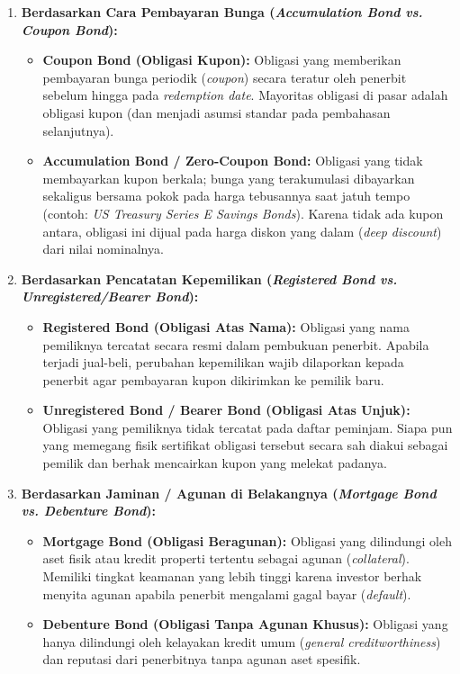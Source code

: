 \documentclass[11pt,a4paper]{article}
\begin{document}
\begin{enumerate}[label=\textbf{\arabic*.}]
    \item \textbf{Berdasarkan Cara Pembayaran Bunga (\textit{Accumulation Bond vs. Coupon Bond}):}
    \begin{itemize}
        \item \textbf{Coupon Bond (Obligasi Kupon):} Obligasi yang memberikan pembayaran bunga periodik (\textit{coupon}) secara teratur oleh penerbit sebelum hingga pada \textit{redemption date}. Mayoritas obligasi di pasar adalah obligasi kupon (dan menjadi asumsi standar pada pembahasan selanjutnya).
        \item \textbf{Accumulation Bond / Zero-Coupon Bond:} Obligasi yang tidak membayarkan kupon berkala; bunga yang terakumulasi dibayarkan sekaligus bersama pokok pada harga tebusannya saat jatuh tempo (contoh: \textit{US Treasury Series E Savings Bonds}). Karena tidak ada kupon antara, obligasi ini dijual pada harga diskon yang dalam (\textit{deep discount}) dari nilai nominalnya.
    \end{itemize}

    \item \textbf{Berdasarkan Pencatatan Kepemilikan (\textit{Registered Bond vs. Unregistered/Bearer Bond}):}
    \begin{itemize}
        \item \textbf{Registered Bond (Obligasi Atas Nama):} Obligasi yang nama pemiliknya tercatat secara resmi dalam pembukuan penerbit. Apabila terjadi jual-beli, perubahan kepemilikan wajib dilaporkan kepada penerbit agar pembayaran kupon dikirimkan ke pemilik baru.
        \item \textbf{Unregistered Bond / Bearer Bond (Obligasi Atas Unjuk):} Obligasi yang pemiliknya tidak tercatat pada daftar peminjam. Siapa pun yang memegang fisik sertifikat obligasi tersebut secara sah diakui sebagai pemilik dan berhak mencairkan kupon yang melekat padanya.
    \end{itemize}

    \item \textbf{Berdasarkan Jaminan / Agunan di Belakangnya (\textit{Mortgage Bond vs. Debenture Bond}):}
    \begin{itemize}
        \item \textbf{Mortgage Bond (Obligasi Beragunan):} Obligasi yang dilindungi oleh aset fisik atau kredit properti tertentu sebagai agunan (\textit{collateral}). Memiliki tingkat keamanan yang lebih tinggi karena investor berhak menyita agunan apabila penerbit mengalami gagal bayar (\textit{default}).
        \item \textbf{Debenture Bond (Obligasi Tanpa Agunan Khusus):} Obligasi yang hanya dilindungi oleh kelayakan kredit umum (\textit{general creditworthiness}) dan reputasi dari penerbitnya tanpa agunan aset spesifik.
    \end{itemize}
\end{enumerate}
\end{document}

